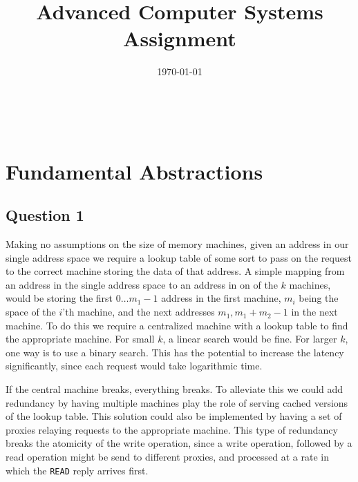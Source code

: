\documentclass[10pt,a4paper]{article}
\title
{
    Advanced Computer Systems \\
    {\Large Assignment \assignmentnumber}
}
\author
{
    \authform{Hans J. T. Stephensen}{abc123}
    \and
    \authform{?}{abc123}
    \and
    \authform{Casper B. Hansen}{fvx507}
}
\date{\today}
\newcommand{\theabstract}
{
    \lipsum[1-1]
}
\newcommand{\colbreak}{{\ }\vfill\columnbreak}
\begin{document}
\clearpage
\maketitle
\thispagestyle{empty}

\setlength{\columnsep}{0pt}
\begin{multicols}{2}
    \abstract{\theabstract}
    \colbreak
    \tableofcontents
\end{multicols}
\setlength{\columnsep}{10pt}
\clearpage



\section{Fundamental Abstractions}

\subsection{Question 1}

Making no assumptions on the size of memory machines, given an address in our single address space we require a lookup table of some sort to pass on the request to the correct machine storing the data of that address. A simple mapping from an address in the single address space to an address in on of the $k$ machines, would be storing the first $0 \dots m_1-1$ address in the first machine, $m_i$ being the space of the $i$'th machine, and the next addresses $m_1, m_1+m_2-1$ in the next machine. To do this we require a centralized machine with a lookup table to find the appropriate machine. For small $k$, a linear search would be fine. For larger $k$, one way is to use a binary search. This has the potential to increase the latency significantly, since each request would take logarithmic time.

If the central machine breaks, everything breaks. To alleviate this we could add redundancy by having multiple machines play the role of serving cached versions of the lookup table. This solution could also be implemented by having a set of proxies relaying requests to the appropriate machine. This type of redundancy breaks the atomicity of the write operation, since a write operation, followed by a read operation might be send to different proxies, and processed at a rate in which the {\tt READ} reply arrives first.
\end{document}
